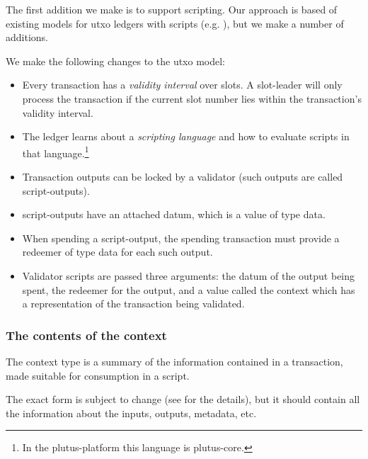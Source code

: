 
The first addition we make is to support scripting.
Our approach is based of existing models for \gls{utxo} ledgers with scripts (e.g. \textcite{Zahnentferner18-UTxO}), but we make a number of additions.

We make the following changes to the \gls{utxo} model:

\begin{itemize}
\item
  Every transaction has a \emph{validity interval} over slots.
  A \gls{slot-leader} will only process the transaction if the current slot number lies within the transaction's validity interval.

\item
  The ledger learns about a \emph{scripting language} and how to evaluate scripts in that language.\footnote{
    In the \gls{plutus-platform} this language is \gls{plutus-core}.
    }

\item
  Transaction outputs can be locked by a \gls{validator} (such outputs are called \glspl{script-output}).

\item
  \Glspl{script-output} have an attached \gls{datum}, which is a value of type \gls{data}.

\item
  When spending a \gls{script-output}, the spending transaction must provide a \gls{redeemer} of type \gls{data} for each such output.

\item
  Validator scripts are passed three arguments: the \gls{datum} of the output being spent, the \gls{redeemer} for the output, and a value called the \gls{context} which has a representation of the transaction being validated.
\end{itemize}


\subsubsection{The contents of the context}
The \gls{context} type is a summary of the information contained in a transaction, made suitable for consumption in a \gls{script}.

The exact form is subject to change (see \textcite{eutxo} for the details), but it should contain all the information about the inputs, outputs, metadata, etc.

